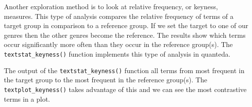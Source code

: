 \documentclass[
]{article}
\newenvironment{Shaded}{\begin{snugshade}}{\end{snugshade}}
\newcommand{\AttributeTok}[1]{\textcolor[rgb]{0.77,0.63,0.00}{#1}}
\newcommand{\CommentTok}[1]{\textcolor[rgb]{0.56,0.35,0.01}{\textit{#1}}}
\newcommand{\DecValTok}[1]{\textcolor[rgb]{0.00,0.00,0.81}{#1}}
\newcommand{\FunctionTok}[1]{\textcolor[rgb]{0.00,0.00,0.00}{#1}}
\newcommand{\NormalTok}[1]{#1}
\newcommand{\OtherTok}[1]{\textcolor[rgb]{0.56,0.35,0.01}{#1}}
\newcommand{\SpecialCharTok}[1]{\textcolor[rgb]{0.00,0.00,0.00}{#1}}
\newcommand{\StringTok}[1]{\textcolor[rgb]{0.31,0.60,0.02}{#1}}
\begin{document}
Another exploration method is to look at relative frequency, or keyness, measures. This type of analysis compares the relative frequency of terms of a target group in comparison to a reference group. If we set the target to one of our genres then the other genres become the reference. The results show which terms occur significantly more often than they occur in the reference group(s). The \texttt{textstat\_keyness()} function implements this type of analysis in quanteda.

\begin{Shaded}
\end{Shaded}

The output of the \texttt{textstat\_keyness()} function all terms from most frequent in the target group to the most frequent in the reference group(s). The \texttt{textplot\_keyness()} takes advantage of this and we can see the most contrastive terms in a plot.
\end{document}

